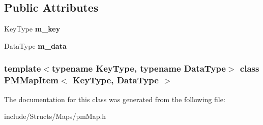 \subsection*{Public Attributes}
\begin{DoxyCompactItemize}
\item 
\hypertarget{class_p_m_map_item_ad5d4c8ea0f2974804d4205cbbc4c6053}{
KeyType {\bfseries m\_\-key}}
\label{class_p_m_map_item_ad5d4c8ea0f2974804d4205cbbc4c6053}

\item 
\hypertarget{class_p_m_map_item_ab35fddc9b0e9d14f78453cd5e9249c56}{
DataType {\bfseries m\_\-data}}
\label{class_p_m_map_item_ab35fddc9b0e9d14f78453cd5e9249c56}

\end{DoxyCompactItemize}
\subsubsection*{template$<$typename KeyType, typename DataType$>$ class PMMapItem$<$ KeyType, DataType $>$}



The documentation for this class was generated from the following file:\begin{DoxyCompactItemize}
\item 
include/Structs/Maps/pmMap.h\end{DoxyCompactItemize}
